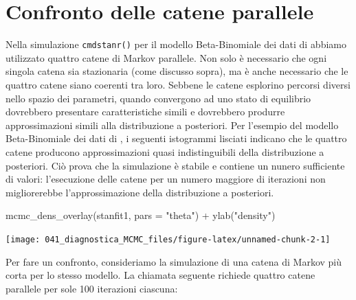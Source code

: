 \documentclass[
  11pt,
  italian,
  a4paper,
  extrafontsizes,onecolumn,openright
  ]{memoir}
\newenvironment{Shaded}{\begin{snugshade}}{\end{snugshade}}
\newcommand{\AttributeTok}[1]{\textcolor[rgb]{0.77,0.63,0.00}{#1}}
\newcommand{\FunctionTok}[1]{\textcolor[rgb]{0.00,0.00,0.00}{#1}}
\newcommand{\NormalTok}[1]{#1}
\newcommand{\SpecialCharTok}[1]{\textcolor[rgb]{0.00,0.00,0.00}{#1}}
\newcommand{\StringTok}[1]{\textcolor[rgb]{0.31,0.60,0.02}{#1}}
\begin{document}
\hypertarget{confronto-delle-catene-parallele}{%
\section{Confronto delle catene parallele}\label{confronto-delle-catene-parallele}}

Nella simulazione \texttt{cmdstanr()} per il modello Beta-Binomiale dei dati di \textcite{Gautret_2020} abbiamo utilizzato quattro catene di Markov parallele. Non solo è necessario che ogni singola catena sia stazionaria (come discusso sopra), ma è anche necessario che le quattro catene siano coerenti tra loro. Sebbene le catene esplorino percorsi diversi nello spazio dei parametri, quando convergono ad uno stato di equilibrio dovrebbero presentare caratteristiche simili e dovrebbero produrre approssimazioni simili alla distribuzione a posteriori. Per l'esempio del modello Beta-Binomiale dei dati di \textcite{Gautret_2020}, i seguenti istogrammi lisciati indicano che le quattro catene producono approssimazioni quasi indistinguibili della distribuzione a posteriori. Ciò prova che la simulazione è stabile e contiene un nunero sufficiente di valori: l'esecuzione delle catene per un numero maggiore di iterazioni non migliorerebbe l'approssimazione della distribuzione a posteriori.

\begin{Shaded}
\begin{Highlighting}[]
\FunctionTok{mcmc\_dens\_overlay}\NormalTok{(stanfit1, }\AttributeTok{pars =} \StringTok{"theta"}\NormalTok{) }\SpecialCharTok{+}
  \FunctionTok{ylab}\NormalTok{(}\StringTok{"density"}\NormalTok{)}
\end{Highlighting}
\end{Shaded}

\begin{center}\texttt{[image: 041\_diagnostica\_MCMC\_files/figure-latex/unnamed-chunk-2-1]} \end{center}

Per fare un confronto, consideriamo la simulazione di una catena di Markov più corta per lo stesso modello. La chiamata seguente richiede quattro catene parallele per sole 100 iterazioni ciascuna:
\end{document}
